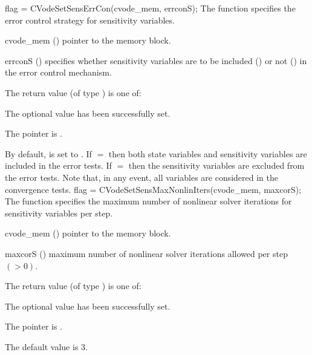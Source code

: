 {
  flag = CVodeSetSensErrCon(cvode\_mem, errconS);
}
{
  The function  specifies the error control
  strategy for sensitivity variables.
}
{
  \begin{args}
  \item[cvode\_mem] ()
    pointer to the {\cvodes} memory block.
  \item[errconS] ()
    specifies whether sensitivity variables are to be included () or not
    () in the error control mechanism.
  \end{args}
}
{
  The return value  (of type ) is one of:
  \begin{args}
  \item[\Id{CV\_SUCCESS}] 
    The optional value has been successfully set.
  \item[\Id{CV\_MEM\_NULL}]
    The  pointer is .
  \end{args}
}
{
  By default,  is set to . 
  If $=$ then both state variables and
  sensitivity variables are included in the error tests. 
  If $=$ then the sensitivity variables are excluded from the 
  error tests. Note that, in any event, all variables are considered in the convergence 
  tests.
}
{
  flag = CVodeSetSensMaxNonlinIters(cvode\_mem, maxcorS);
}
{
  The function  specifies the maximum
  number of nonlinear solver iterations for sensitivity variables per step.
}
{
  \begin{args}
  \item[cvode\_mem] ()
    pointer to the {\cvodes} memory block.
  \item[maxcorS] ()
    maximum number of nonlinear solver iterations allowed per step $(> 0)$.
  \end{args}
}
{
  The return value  (of type ) is one of:
  \begin{args}
  \item[\Id{CV\_SUCCESS}] 
    The optional value has been successfully set.
  \item[\Id{CV\_MEM\_NULL}]
    The  pointer is .
  \end{args}
}
{
  The default value is $3$.
}

